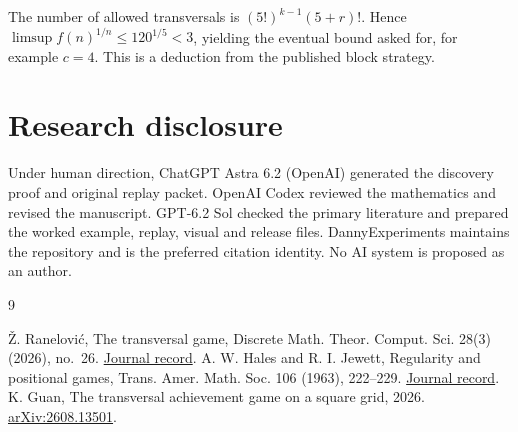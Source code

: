 \documentclass[11pt]{amsart}
\begin{document}
The number of allowed transversals is \((5!)^{k-1}(5+r)!\). Hence \(\limsup f(n)^{1/n}\le120^{1/5}<3\), yielding the eventual bound asked for, for example \(c=4\). This is a deduction from the published block strategy.

\section*{Research disclosure}
Under human direction, ChatGPT Astra 6.2 (OpenAI) generated the discovery proof and original replay packet. OpenAI Codex reviewed the mathematics and revised the manuscript. GPT-6.2 Sol checked the primary literature and prepared the worked example, replay, visual and release files. DannyExperiments maintains the repository and is the preferred citation identity. No AI system is proposed as an author.

\begin{thebibliography}{9}
\raggedright
{} \v{Z}. Ran{\dj}elovi\'c, The transversal game, Discrete Math. Theor. Comput. Sci. 28(3) (2026), no.~26. \href{https://dmtcs.episciences.org/en/articles/19063}{Journal record}.
 A. W. Hales and R. I. Jewett, Regularity and positional games, Trans. Amer. Math. Soc. 106 (1963), 222--229. \href{https://www.jstor.org/stable/1993764}{Journal record}.
 K. Guan, The transversal achievement game on a square grid, 2026. \href{https://arxiv.org/abs/2608.13501}{arXiv:2608.13501}.
\end{thebibliography}
\end{document}
